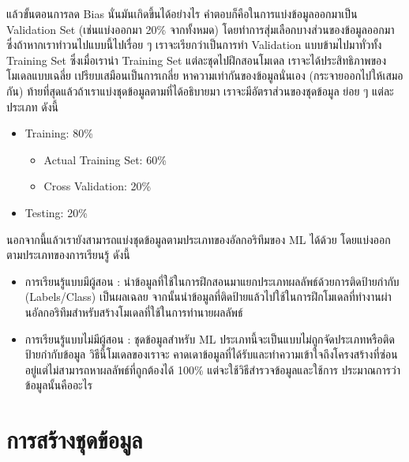 แล้วขั้นตอนการลด Bias นั่นมันเกิดขึ้นได้อย่างไร คำตอบก็คือในการแบ่งข้อมูลออกมาเป็น Validation Set (เช่นแบ่งออกมา 20\% จากทั้งหมด)
โดยทำการสุ่มเลือกบางส่วนของข้อมูลออกมา ซึ่งถ้าหากเราทำวนไปแบบนี้ไปเรื่อย ๆ เราจะเรียกว่าเป็นการทำ Validation แบบข้ามไปมาทั่วทั้ง 
Training Set ซึ่งเมื่อเรานำ Training Set แต่ละชุดไปฝึกสอนโมเดล เราจะได้ประสิทธิภาพของโมเดลแบบเฉลี่ย เปรียบเสมือนเป็นการเกลี่ย%
หาความเท่ากันของข้อมูลนั่นเอง (กระจายออกไปให้เสมอกัน) ท้ายที่สุดแล้วถ้าเราแบ่งชุดข้อมูลตามที่ได้อธิบายมา เราจะมีอัตราส่วนของชุดข้อมูล%
ย่อย ๆ แต่ละประเภท ดังนี้

\begin{itemize}
    \item Training: 80\%
    \begin{itemize}
        \item Actual Training Set: 60\%
        
        \item Cross Validation: 20\%
    \end{itemize}
    
    \item Testing: 20\%
\end{itemize}

นอกจากนี้แล้วเรายังสามารถแบ่งชุดข้อมูลตามประเภทของอัลกอริทึมของ ML ได้ด้วย โดยแบ่งออกตามประเภทของการเรียนรู้ ดังนี้

\begin{itemize}
    \item การเรียนรู้แบบมีผู้สอน : นำข้อมูลที่ใช้ในการฝึกสอนมาแยกประเภทผลลัพธ์ด้วยการติดป้ายกำกับ (Labels/Class) เป็นผลเฉลย 
    จากนั้นนำข้อมูลที่ติดป้ายแล้วไปใช้ในการฝึกโมเดลที่ทำงานผ่านอัลกอริทึมสำหรับสร้างโมเดลที่ใช้ในการทำนายผลลัพธ์
    
    \item การเรียนรู้แบบไม่มีผู้สอน : ชุดข้อมูลสำหรับ ML ประเภทนี้จะเป็นแบบไม่ถูกจัดประเภทหรือติดป้ายกำกับข้อมูล วิธีนี้โมเดลของเราจะ%
    คาดเดาข้อมูลที่ได้รับและทำความเข้าใจถึงโครงสร้างที่ซ่อนอยู่แต่ไม่สามารถหาผลลัพธ์ที่ถูกต้องได้ 100\% แต่จะใช้วิธีสำรวจข้อมูลและใช้การ%
    ประมาณการว่าข้อมูลนั้นคืออะไร
\end{itemize}

\section{การสร้างชุดข้อมูล}
\label{sec:create_dataset}

